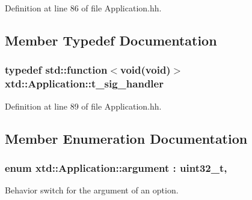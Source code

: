 Definition at line 86 of file Application.\-hh.



\subsection{Member Typedef Documentation}
\hypertarget{classxtd_1_1Application_a907b6fe8247636495890e668530863d6}{
\subsubsection[{t\-\_\-sig\-\_\-handler}]{\setlength{\rightskip}{0pt plus 5cm}typedef std\-::function$<$void(void)$>$ {\bf xtd\-::\-Application\-::t\-\_\-sig\-\_\-handler}\hspace{0.3cm}{\ttfamily [protected]}}}\label{classxtd_1_1Application_a907b6fe8247636495890e668530863d6}


Definition at line 89 of file Application.\-hh.



\subsection{Member Enumeration Documentation}
\hypertarget{classxtd_1_1Application_a672c075ed901e463609077d571a714c7}{
\subsubsection[{argument}]{\setlength{\rightskip}{0pt plus 5cm}enum {\bf xtd\-::\-Application\-::argument} \-: uint32\-\_\-t\hspace{0.3cm}{\ttfamily [strong]}, {\ttfamily [protected]}}}\label{classxtd_1_1Application_a672c075ed901e463609077d571a714c7}


Behavior switch for the argument of an option. 

